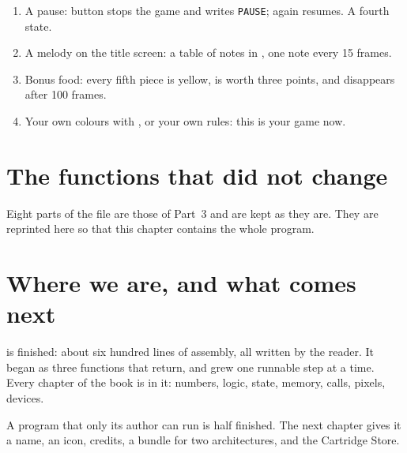 \begin{exercise}[on \prg]
\begin{enumerate}[nosep]
\item A pause: button  stops the game and writes \texttt{PAUSE};
   again resumes. A fourth state.
\item A melody on the title screen: a table of notes in , one
  note every 15 frames.
\item Bonus food: every fifth piece is yellow, is worth three points, and
  disappears after 100 frames.
\item Your own colours with , or your own rules:
  this is your game now.
\end{enumerate}
\end{exercise}

\section{The functions that did not change}

Eight parts of the file are those of Part~3 and are kept as they are. They
are reprinted here so that this chapter contains the whole program.


\section{Where we are, and what comes next}

\vermone is finished: about six hundred lines of \riscv assembly, all written
by the reader. It began as three functions that return, and grew one runnable
step at a time. Every chapter of the book is in it: numbers, logic, state,
memory, calls, pixels, devices.

A program that only its author can run is half finished. The next chapter
gives it a name, an icon, credits, a bundle for two architectures, and the
Cartridge Store.
